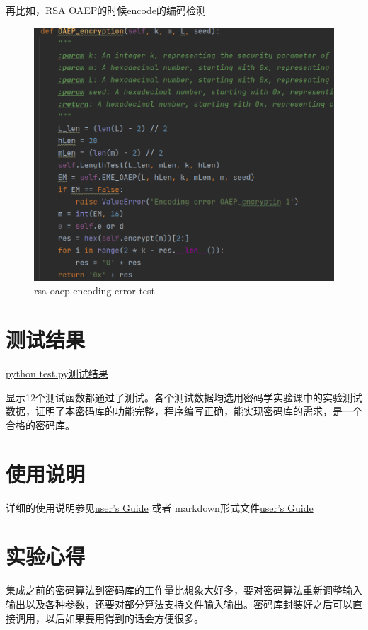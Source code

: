 \documentclass{article}
\begin{document}
\begin{sloppypar}
	再比如，RSA OAEP的时候encode的编码检测
	\begin{figure}[H]
		\centering
		\includegraphics[scale=0.8]{pic/RSA OAEP encoding error.png}
		\caption{rsa oaep encoding error test}
		\label{figure}
		
	\end{figure}
	
	\section{测试结果}
	\href{run:../test result -.html}{python test.py测试结果}
	
	显示12个测试函数都通过了测试。各个测试数据均选用密码学实验课中的实验测试数据，证明了本密码库的功能完整，程序编写正确，能实现密码库的需求，是一个合格的密码库。
	\section{使用说明}
	详细的使用说明参见\href{../user's Guide.pdf}{user's Guide} 或者 markdown形式文件\href{../user's Guide.md}{user's Guide}
	\section{实验心得}
	集成之前的密码算法到密码库的工作量比想象大好多，要对密码算法重新调整输入输出以及各种参数，还要对部分算法支持文件输入输出。密码库封装好之后可以直接调用，以后如果要用得到的话会方便很多。
	
\end{sloppypar}
\end{document}
